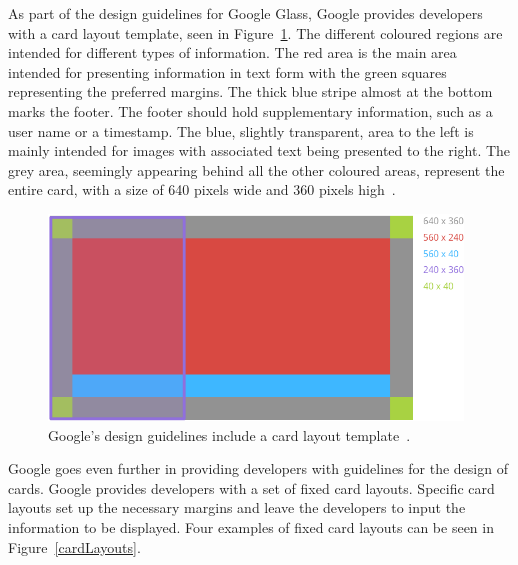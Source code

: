 As part of the design guidelines for Google Glass, Google provides developers with a card layout template, seen in Figure~\ref{GlassDesignStyle}. The different coloured regions are intended for different types of information. The red area is the main area intended for presenting information in text form with the green squares representing the preferred margins. The thick blue stripe almost at the bottom marks the footer. The footer should hold supplementary information, such as a user name or a timestamp. The blue,  slightly transparent, area to the left is mainly intended for images with associated text being presented to the right. The grey area, seemingly appearing behind all the other coloured areas, represent the entire card, with a size of 640 pixels wide and 360 pixels high~\cite{glassDesignStyle}.

	\begin{figure}[ht!]
		\centering
		\includegraphics[width=110mm]{images/standard-template}
		\caption{Google's design guidelines include a card layout template~\cite{glassDesignStyle}.}
		\label{GlassDesignStyle}
	\end{figure}

Google goes even further in providing developers with guidelines for the design of cards. Google provides developers with a set of fixed card layouts. Specific card layouts set up the necessary margins and leave the developers to input the information to be displayed. Four examples of fixed card layouts can be seen in Figure~\ref{cardLayouts}.

